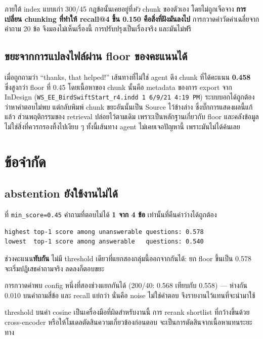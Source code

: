 \documentclass[11pt,a4paper]{article}
\newcommand{\code}[1]{\texttt{\small #1}}
\begin{document}
ภายใต้ index แบบเก่า 300/45 กฎข้อนั้นเคยอยู่ที่\emph{หัว} chunk ของตัวเอง
โดยไม่ถูกเจือจาง \textbf{การเปลี่ยน chunking ที่ทำให้ recall@4 ขึ้น 0.150
คือสิ่งที่ฝังมันลงไป} การกวาดค่าวัดค่าเฉลี่ยจากคำถาม 20 ข้อ จึงมองไม่เห็นเรื่องนี้
การปรับปรุงเป็นเรื่องจริง และมันไม่ฟรี

\subsection{ขยะจากการแปลงไฟล์ผ่าน floor ของคะแนนได้}
\label{sec:noise}

เมื่อถูกถามว่า “thanks, that helped!” เส้นทางที่ไม่ใช่ agent ดึง chunk ที่ได้คะแนน
\textbf{0.458} ซึ่งสูงกว่า floor ที่ 0.45 โดยเนื้อหาของ chunk นั้นคือ metadata ของการ
export จาก InDesign (\code{WS\_EE\_BirdSwiftStart\_r4.indd 1 6/9/21 4:19 PM})
ระบบบอกได้ถูกต้องว่าหาคำตอบไม่พบ แต่กลับพิมพ์ chunk ขยะอันนั้นเป็น Source ไว้ข้างล่าง
ซึ่งบั๊กการแสดงผลนี้แก้แล้ว ส่วนพฤติกรรมของ retrieval ปล่อยไว้ตามเดิม
เพราะเป็นหลักฐานเกี่ยวกับ floor และคลังข้อมูล ไม่ใช่สิ่งที่ควรกรองทิ้งไปเงียบ ๆ
ทั้งนี้เส้นทาง agent ไม่เคยเจอปัญหานี้ เพราะมันไม่ได้ค้นเลย

\section{ข้อจำกัด}

\subsection{abstention ยังใช้งานไม่ได้}
\label{sec:abstain}

ที่ \code{min\_score=0.45} คำถามที่ตอบไม่ได้ \textbf{1 จาก 4 ข้อ}
เท่านั้นที่คืนค่าว่างได้ถูกต้อง

\begin{lstlisting}
highest top-1 score among unanswerable questions: 0.578
lowest  top-1 score among answerable   questions: 0.540
\end{lstlisting}

ช่วงคะแนน\textbf{ทับกัน} ไม่มี threshold เดียวที่แยกสองกลุ่มนี้ออกจากกันได้:
ยก floor ขึ้นเป็น 0.578 จะเริ่มปฏิเสธคำถามจริง ลดลงก็ตอบขยะ

การกวาดค่าพบ config หนึ่งที่สองช่วงแยกกันได้ (200/40: 0.568 เทียบกับ 0.558) ---
ห่างกัน 0.010 บนคำถามสี่ข้อ และ recall แย่กว่า นั่นคือ noise ไม่ใช่คำตอบ
จึงรายงานไว้แทนที่จะนำมาใช้

threshold บนค่า cosine เป็นเครื่องมือที่ผิดสำหรับงานนี้
การ rerank shortlist ที่กว้างขึ้นด้วย cross-encoder
หรือให้โมเดลตัดสินความเกี่ยวข้องก่อนตอบ จะเป็นการตัดสินจากเนื้อหาแทนระยะทาง
\end{document}
